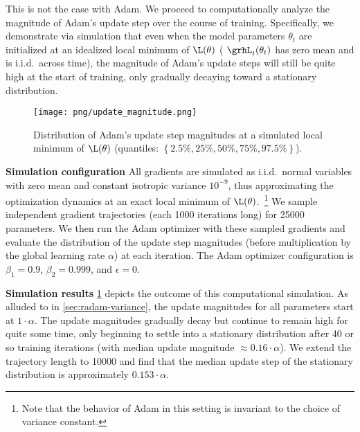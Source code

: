 {This is not the case with Adam. We proceed to computationally analyze the magnitude of Adam's update step over the course of training. Specifically, we demonstrate via simulation that even when the model parameters $\theta_t$ are initialized at an idealized local minimum of $\L(\theta)$ (\ie{} $\grhL_t(\theta_t)$ has zero mean and is i.i.d.\ across time), the magnitude of Adam's update steps will still be quite high at the start of training, only gradually decaying toward a stationary distribution.

\begin{figure}[t]
\centering

\captionsetup{
  justification=centering,
  margin=0.1in,
  size=normalsize
}

\texttt{[image: png/update\_magnitude.png]}
  
\caption{Distribution of Adam's update step magnitudes at a simulated local minimum of $\L(\theta)$ (quantiles: $\left\{ 2.5\%, 25\%, 50\%, 75\%, 97.5\% \right\}$).}
  
\label{fig:simulated-update-distribution}\end{figure}

\textbf{Simulation configuration} \quad  All gradients are simulated as i.i.d.\, normal variables with zero mean and constant isotropic variance $10^{-9}$, thus approximating the optimization dynamics at an exact local minimum of $\L(\theta)$.~\footnote{Note that the behavior of Adam in this setting is invariant to the choice of variance constant.} We sample independent gradient trajectories (each 1000 iterations long) for 25000 parameters. We then run the Adam optimizer with these sampled gradients and evaluate the distribution of the update step magnitudes (before multiplication by the global learning rate $\alpha$) at each iteration. The Adam optimizer configuration is $\beta_1 = 0.9$, $\beta_2 = 0.999$, and $\epsilon = 0$.

\textbf{Simulation results} \quad \cref*{fig:simulated-update-distribution} depicts the outcome of this computational simulation. As alluded to in \cref*{sec:radam-variance}, the update magnitudes for all parameters start at $1 \cdot \alpha$. The update magnitudes gradually decay but continue to remain high for quite some time, only beginning to settle into a stationary distribution after 40 or so training iterations (with median update magnitude $\approx 0.16 \cdot \alpha$). We extend the trajectory length to 10000 and find that the median update step of the stationary distribution is approximately $0.153 \cdot \alpha$.

}
